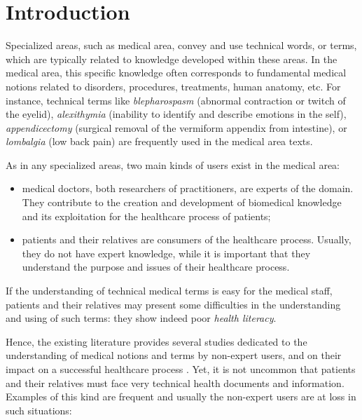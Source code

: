 \chapter{Introduction}
Specialized areas, such as medical area, convey and use technical words, or terms, which are typically related to knowledge developed within these areas. In the medical area, this specific knowledge often corresponds to fundamental medical notions related to disorders, procedures, treatments, human anatomy, etc. For instance, technical terms like \textit{blepharospasm} (abnormal contraction or twitch of the eyelid), \textit{alexithymia} (inability to identify and describe emotions in the self), \textit{appendicectomy} (surgical removal of the vermiform appendix from intestine), or \textit{lombalgia} (low back pain) are frequently used in the medical area texts.

As in any specialized areas, two main kinds of users exist in the medical area:

\begin{itemize}
    \item medical doctors, both researchers of practitioners, are experts of the domain. They contribute to the creation and development of biomedical knowledge and its exploitation for the healthcare process of patients;
    
    \item  patients and their relatives are consumers of the healthcare process. Usually, they do not have expert knowledge, while it is important that they understand the purpose and issues of their healthcare process. 
\end{itemize}
If the understanding of technical medical terms is easy for the medical staff, patients and their relatives may present some difficulties in the understanding and using of such terms: they show indeed poor \textit{health literacy}. 

Hence, the existing literature provides several studies dedicated to the understanding of medical notions and terms by non-expert users, and on their impact on a successful healthcare process \citep{Mcgray-JAMIA2005,Eysenbach-JMIR2007}. Yet, it is not uncommon that patients and their relatives must face very technical health documents and information. Examples of this kind are frequent and usually the non-expert users are at loss in such situations:

